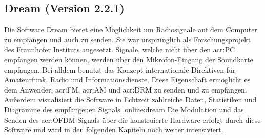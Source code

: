 \subsection{Dream (Version 2.2.1)}
\label{subsec:dreamsoft}
Die Software Dream bietet eine Möglichkeit um Radiosignale auf dem Computer zu empfangen und auch zu senden. Sie war ursprünglich als Forschungsprojekt des Fraunhofer Instituts angesetzt. Signale, welche nicht über den \gls{acr:PC} empfangen werden können, werden über den Mikrofon-Eingang der Soundkarte empfangen.
Bei alldem benutzt das Konzept internationale Direktiven für Amateurfunk, Radio und Informationsdienste. Diese Eigenschaft ermöglicht es dem Anwender, \gls{acr:FM}, \gls{acr:AM} und \gls{acr:DRM} zu senden und zu empfangen. Außerdem visualisiert die Software in Echtzeit zahlreiche Daten, Statistiken und Diagramme des empfangenen Signals. \gls{online:dream} Die Modulation und das Senden des \gls{acr:OFDM}-Signals über die konstruierte Hardware erfolgt durch diese Software und wird in den folgenden Kapiteln noch weiter intensiviert.